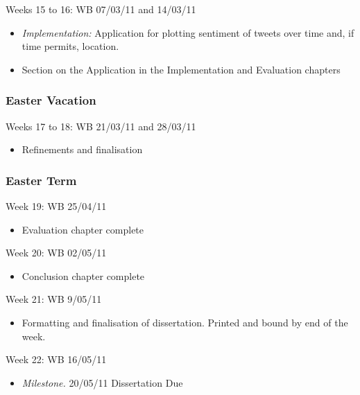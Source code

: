 \noindent
Weeks 15 to 16: WB 07/03/11 and 14/03/11

\begin{itemize}

\item \emph{Implementation:} Application for plotting sentiment of tweets over time and, if time permits, location.
\item Section on the Application in the Implementation and Evaluation chapters

\end{itemize}

\subsubsection*{Easter Vacation}

\noindent
Weeks 17 to 18: WB 21/03/11 and 28/03/11

\begin{itemize}

\item Refinements and finalisation

\end{itemize}

\subsubsection*{Easter Term}

\noindent
Week 19: WB 25/04/11

\begin{itemize}

\item Evaluation chapter complete

\end{itemize}

\noindent
Week 20: WB 02/05/11

\begin{itemize}

\item Conclusion chapter complete

\end{itemize}

\noindent
Week 21: WB 9/05/11

\begin{itemize}

\item Formatting and finalisation of dissertation. Printed and bound by end of the week.

\end{itemize}

\noindent
Week 22: WB 16/05/11

\begin{itemize}

\item{\emph{Milestone.} 20/05/11 Dissertation Due}

\end{itemize}